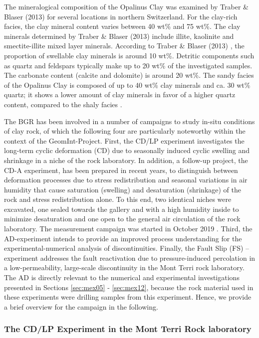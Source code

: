 The mineralogical composition of the Opalinus Clay was examined by Traber \& Blaser (2013) \cite{traber2013} for several locations in northern Switzerland. For the clay-rich facies, the clay mineral content varies between 40 wt\% and 75 wt\%. The clay minerals determined by Traber \& Blaser (2013) \cite{traber2013} include illite, kaolinite and smectite-illite mixed layer minerals. According to Traber \& Blaser (2013) \cite{traber2013}, the proportion of swellable clay minerals is around 10 wt\%. Detritic components such as quartz and feldspars typically make up to 20 wt\% of the investigated samples. The carbonate content (calcite and dolomite) is around 20 wt\%. The sandy facies of the Opalinus Clay is composed of up to 40 wt\% clay minerals and ca. 30 wt\% quartz; it shows a lower amount of clay minerals in favor of a higher quartz content, compared to the shaly facies \cite{heitzmann2001}. 

The BGR has been involved in a number of campaigns to study in-situ conditions of clay rock, of which the following four are particularly noteworthy within the context of the GeomInt-Project. First, the CD/LP experiment investigates the long-term cyclic deformation (CD) due to seasonally induced cyclic swelling and shrinkage in a niche of the rock laboratory. In addition, a follow-up project, the CD-A experiment, has been prepared in recent years, to distinguish between deformation processes due to stress redistribution and seasonal variations in air humidity that cause saturation (swelling) and desaturation (shrinkage) of the rock and stress redistribution alone. To this end, two identical niches were excavated, one sealed towards the gallery and with a high humidity inside to minimize desaturation and one open to the general air circulation of the rock laboratory. The measurement campaign was started in October 2019 \cite{ziefle2019}. Third, the AD-experiment intends to provide an improved process understanding for the experimental-numerical analysis of discontinuities. Finally, the Fault Slip (FS) – experiment addresses the fault reactivation due to pressure-induced percolation in a low-permeability, large-scale discontinuity in the Mont Terri rock laboratory. The AD is directly relevant to the numerical and experimental investigations presented in Sections \ref{sec:mex05} - \ref{sec:mex12}, because the rock material used in these experiments were drilling samples from this experiment. Hence, we provide a brief overview for the campaign in the following. 

\subsubsection{The CD/LP Experiment in the Mont Terri Rock laboratory}

